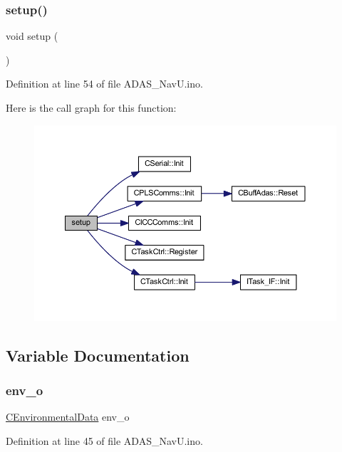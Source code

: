 \subsubsection{\texorpdfstring{setup()}{setup()}}
{\footnotesize\ttfamily void setup (\begin{DoxyParamCaption}{ }\end{DoxyParamCaption})}



Definition at line 54 of file A\+D\+A\+S\+\_\+\+Nav\+U.\+ino.

Here is the call graph for this function\+:
\nopagebreak
\begin{figure}[H]
\begin{center}
\leavevmode
\includegraphics[width=350pt]{_a_d_a_s___nav_u_8ino_a4fc01d736fe50cf5b977f755b675f11d_cgraph}
\end{center}
\end{figure}


\subsection{Variable Documentation}
\mbox{\label{_a_d_a_s___nav_u_8ino_a6c839a9b171c9b833a61a0d7612e2da8}} 
\subsubsection{\texorpdfstring{env\_o}{env\_o}}
{\footnotesize\ttfamily \mbox{\hyperlink{class_c_environmental_data}{C\+Environmental\+Data}} env\+\_\+o}



Definition at line 45 of file A\+D\+A\+S\+\_\+\+Nav\+U.\+ino.

